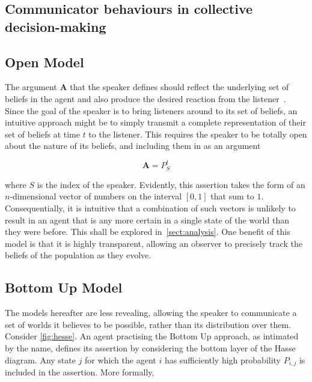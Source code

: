 \subsection{Communicator behaviours in collective decision-making} \label{sect:speaker_models}

\subsection*{Open Model}

The argument $\mathbf{A}$ that the speaker defines should reflect the underlying set of beliefs in the agent and also produce the desired reaction from the listener~\cite{Lewis2002ConventionStudy}. Since the goal of the speaker is to bring listeners around to its set of beliefs, an intuitive approach might be to simply transmit a complete representation of their set of beliefs at time $t$ to the listener. This requires the speaker to be totally open about the nature of its beliefs, and including them in as an argument  

\begin{equation}
    \mathbf{A} = P_{S}^t
\end{equation}

where $S$ is the index of the speaker. Evidently, this assertion takes the form of an $n$-dimensional vector of numbers on the interval $[0,1]$ that sum to $1$. Consequentially, it is intuitive that a combination of such vectors is unlikely to result in an agent that is any more certain in a single state of the world than they were before. This shall be explored in~\cref{sect:analysis}. One benefit of this model is that it is highly transparent, allowing an observer to precisely track the beliefs of the population as they evolve. 


\subsection*{Bottom Up Model}

The models hereafter are less revealing, allowing the speaker to communicate a set of worlds it believes to be possible, rather than its distribution over them. Consider \cref{fig:hesse}. An agent practising the Bottom Up approach, as intimated by the name, defines its assertion by considering the bottom layer of the Hasse diagram. Any state $j$ for which the agent $i$ has sufficiently high probability $P_{i,j}$ is included in the assertion. More formally, 

